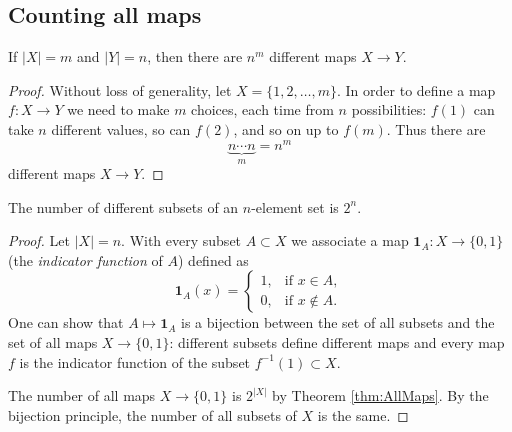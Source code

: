 \begin{page}

\subsection{Counting all maps}

\end{page}

\begin{page}

\begin{thm}
\label{thm:AllMaps}
If $|X| = m$ and $|Y| = n$, then there are $n^m$ different maps $X \to Y$.
\end{thm}

\end{page}

\begin{page}

\begin{proof}
Without loss of generality, let $X = \{1, 2, \ldots, m\}$.
In order to define a map $f \colon X \to Y$ we need to make $m$ choices, each time from $n$ possibilities:
$f(1)$ can take $n$ different values, so can $f(2)$, and so on up to $f(m)$.
Thus there are
\[
\underbrace{n \cdots n}_{m} = n^m
\]
different maps $X \to Y$.
\end{proof}


\end{page}

\begin{page}

\begin{thm}
\label{thm:AllSubsets}
The number of different subsets of an $n$-element set is $2^n$.
\end{thm}

\end{page}

\begin{page}

\begin{proof}
Let $|X| = n$. With every subset $A \subset X$ we associate a map $\mathbf{1}_A \colon X \to \{0,1\}$ (the \emph{indicator function} of $A$) defined as
\[
\mathbf{1}_A(x) =
\begin{cases}
1, &\text{if } x \in A,\\
0, &\text{if } x \notin A.
\end{cases}
\]
One can show that $A \mapsto \mathbf{1}_A$ is a bijection between the set of all subsets and the set of all maps $X \to \{0,1\}$:
different subsets define different maps and every map $f$ is the indicator function of the subset $f^{-1}(1) \subset X$.

The number of all maps $X \to \{0,1\}$ is $2^{|X|}$ by Theorem \ref{thm:AllMaps}.
By the bijection principle, the number of all subsets of $X$ is the same.
\end{proof}


\end{page}

